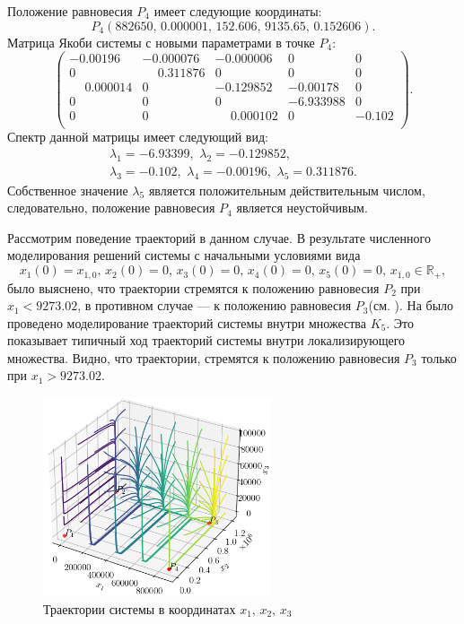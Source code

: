 \documentclass[14pt,a4paper]{extarticle}
\begin{document}
\begin{example}
		Положение равновесия $P_4$ имеет следующие координаты:
		\[P_4\left(882650,\,0.000001,\,152.606,\,9135.65,\,0.152606\right).\]
		Матрица Якоби системы с новыми параметрами в точке $P_4$: 
		\[\begin{pmatrix}
			-0.00196&  -0.000076 &-0.000006&  0    &    0\\
			 0     &   \phantom{-}0.311876&  0     &   0    &    0\\
			 \phantom{-}0.000014&  0     &  -0.129852& -0.00178 &  0\\
			 0   &     0     &   0    &   -6.933988 & 0\\
			 0    &    0   &     \phantom{-}0.000102 & 0    &   -0.102\\
		\end{pmatrix}.\]
		Спектр данной матрицы имеет следующий вид:
		\begin{multline*}
			\lambda_1=-6.93399,\,\, \lambda_2=-0.129852,\\
			\lambda_3=-0.102,\,\, \lambda_4=-0.00196,\,\, \lambda_5=0.311876.
		\end{multline*}
		Собственное значение $\lambda_5$ является положительным действительным числом, следовательно, положение равновесия $P_4$ является неустойчивым. 
		
		Рассмотрим поведение траекторий в данном случае. В результате численного моделирования решений системы с начальными условиями вида 
		\[x_1(0)=x_{1,0},\, x_2(0)=0,\, x_3(0)=0,\, x_4(0)=0,\, x_5(0)=0,\, x_{1,0}\in\mathbb{R}_{+},\]
		было выяснено, что траектории стремятся к положению равновесия $P_2$ при $x_1 < 9273.02$, в противном случае --- к положению равновесия $P_3$(см. ). 
		На  было проведено моделирование траекторий системы внутри множества $K_5$. Это показывает типичный ход траекторий системы внутри локализирующего множества. Видно, что траектории, стремятся к положению равновесия $P_3$ только при $x_1>9273.02$.
		
		\begin{figure}[h]
			\centering
			\includegraphics[width=0.60\textwidth]{media/Figure_16.png}
			\caption{Траектории системы в координатах $x_1,\, x_2,\, x_3$}
			\label{fig:model_K5_new}
		\end{figure}
	\end{example}
	
\end{document}
